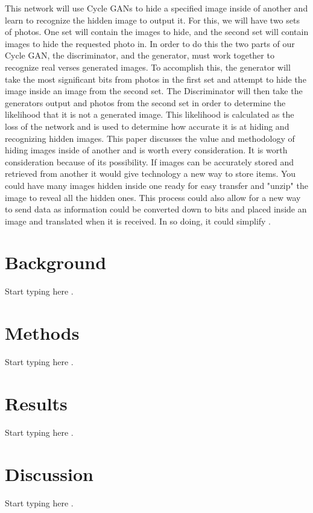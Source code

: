 \documentclass[conference]{IEEEtran}
\begin{document}
This network will use Cycle GANs to hide a specified image inside of another and learn to recognize the hidden image to output it. For this, we will have two sets of photos. One set will contain the images to hide, and the second set will contain images to hide the requested photo in. In order to do this the two parts of our Cycle GAN, the discriminator, and the generator, must work together to recognize real verses generated images. To accomplish this, the generator will take the most significant bits from photos in the first set and attempt to hide the image inside an image from the second set. The Discriminator will then take the generators output and photos from the second set in order to determine the likelihood that it is not a generated image. This likelihood is calculated as the loss of the network and is used to determine how accurate it is at hiding and recognizing hidden images.
This paper discusses the value and methodology of hiding images inside of another and is worth every consideration. It is worth consideration because of its possibility. If images can be accurately stored and retrieved from another it would give technology a new way to store items. You could have many images hidden inside one ready for easy transfer and "unzip" the image to reveal all the hidden ones. This process could also allow for a new way to send data as information could be converted down to bits and placed inside an image and translated when it is received. In so doing, it could simplify  \cite{b1}.

\section{Background}

Start typing here \cite{b2}.

\section{Methods}

Start typing here \cite{b3}.

\section{Results}

Start typing here \cite{b4}.

\section{Discussion}

Start typing here \cite{b5}.


\end{document}

